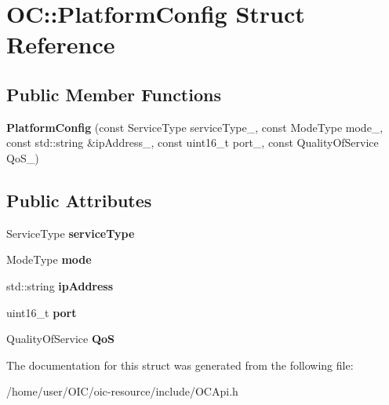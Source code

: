 \hypertarget{structOC_1_1PlatformConfig}{}\section{O\+C\+:\+:Platform\+Config Struct Reference}
\label{structOC_1_1PlatformConfig}
\subsection*{Public Member Functions}
\begin{DoxyCompactItemize}
\item 
\hypertarget{structOC_1_1PlatformConfig_add07f9a72830885112ff96ffc1d158f0}{}{\bfseries Platform\+Config} (const Service\+Type service\+Type\+\_\+, const Mode\+Type mode\+\_\+, const std\+::string \&ip\+Address\+\_\+, const uint16\+\_\+t port\+\_\+, const Quality\+Of\+Service Qo\+S\+\_\+)\label{structOC_1_1PlatformConfig_add07f9a72830885112ff96ffc1d158f0}

\end{DoxyCompactItemize}
\subsection*{Public Attributes}
\begin{DoxyCompactItemize}
\item 
\hypertarget{structOC_1_1PlatformConfig_a025d0ea30e2db9632346200f4268d8f8}{}Service\+Type {\bfseries service\+Type}\label{structOC_1_1PlatformConfig_a025d0ea30e2db9632346200f4268d8f8}

\item 
\hypertarget{structOC_1_1PlatformConfig_a3d89346c486be2884964a636a351039e}{}Mode\+Type {\bfseries mode}\label{structOC_1_1PlatformConfig_a3d89346c486be2884964a636a351039e}

\item 
\hypertarget{structOC_1_1PlatformConfig_a1b37e817bb3273fe6fd6831adbb42b94}{}std\+::string {\bfseries ip\+Address}\label{structOC_1_1PlatformConfig_a1b37e817bb3273fe6fd6831adbb42b94}

\item 
\hypertarget{structOC_1_1PlatformConfig_a74bdb44dc9b385b49b3d1e67d56174ed}{}uint16\+\_\+t {\bfseries port}\label{structOC_1_1PlatformConfig_a74bdb44dc9b385b49b3d1e67d56174ed}

\item 
\hypertarget{structOC_1_1PlatformConfig_a85554e5b5f967a7db287e467409f909b}{}Quality\+Of\+Service {\bfseries Qo\+S}\label{structOC_1_1PlatformConfig_a85554e5b5f967a7db287e467409f909b}

\end{DoxyCompactItemize}


The documentation for this struct was generated from the following file\+:\begin{DoxyCompactItemize}
\item 
/home/user/\+O\+I\+C/oic-\/resource/include/O\+C\+Api.\+h\end{DoxyCompactItemize}
